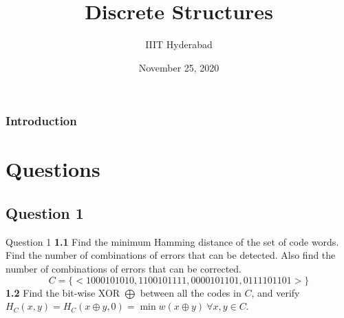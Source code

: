 \documentclass[xcolor=svgnames]{beamer}
\title[Discrete Structures]{Discrete Structures} %
\author{IIIT Hyderabad} %
\institute[] %
{
Monsoon 2020 \\ %
\medskip
\textit{Tutorial 18} %
}
\date{November 25, 2020} %
\begin{document}
\begin{frame}
\titlepage %
\end{frame}

\begin{frame}
\frametitle{Introduction} %
\tableofcontents %
\end{frame}


\section{Questions}

\subsection{Question 1}

\begin{frame}{Question 1}
    \textbf{1.1} Find the minimum Hamming distance of the set of code words. Find the number of combinations of errors that can be detected. Also find the number of combinations of errors that can be corrected.
    \[
        C = \{<1000101010, 1100101111, 0000101101, 0111101101>\} 
    \]
    \textbf{1.2} Find the bit-wise XOR $\bigoplus$ between all the codes in $C$, and verify $H_C(x, y) = H_C(x \oplus y, 0) = \min w(x\oplus y)\  \forall x,y \in C$.

\end{frame}
\end{document}
